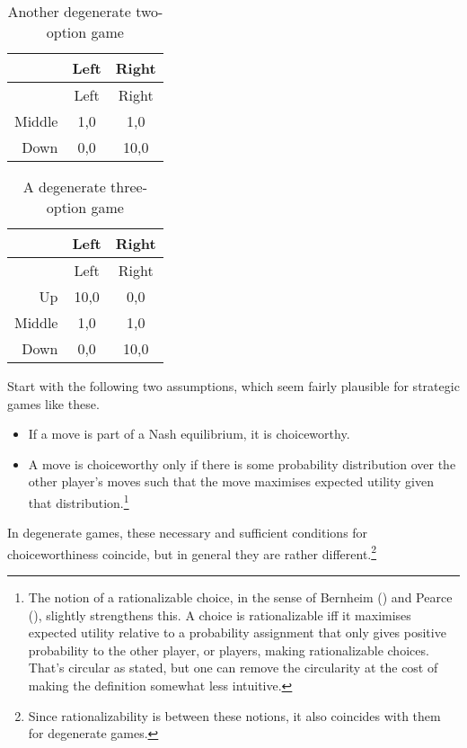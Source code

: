 \documentclass[
  11pt,
  letterpaper,
  DIV=11,
  numbers=noendperiod,
  twoside]{scrartcl}
\providecommand{\tightlist}{%
  \setlength{\itemsep}{0pt}\setlength{\parskip}{0pt}}
\begin{document}
\begin{longtable}[]{@{}rcc@{}}
\caption{Another degenerate two-option
game}\label{tbl-middown}\tabularnewline
\toprule\noalign{}
& Left & Right \\
\midrule\noalign{}
\endfirsthead
\toprule\noalign{}
& Left & Right \\
\midrule\noalign{}
\endhead
\bottomrule\noalign{}
\endlastfoot
Middle & 1,0 & 1,0 \\
Down & 0,0 & 10,0 \\
\end{longtable}

\begin{longtable}[]{@{}rcc@{}}
\caption{A degenerate three-option
game}\label{tbl-allthree}\tabularnewline
\toprule\noalign{}
& Left & Right \\
\midrule\noalign{}
\endfirsthead
\toprule\noalign{}
& Left & Right \\
\midrule\noalign{}
\endhead
\bottomrule\noalign{}
\endlastfoot
Up & 10,0 & 0,0 \\
Middle & 1,0 & 1,0 \\
Down & 0,0 & 10,0 \\
\end{longtable}

Start with the following two assumptions, which seem fairly plausible
for strategic games like these.

\begin{itemize}
\tightlist
\item
  If a move is part of a Nash equilibrium, it is choiceworthy.
\item
  A move is choiceworthy only if there is some probability distribution
  over the other player's moves such that the move maximises expected
  utility given that distribution.\footnote{The notion of a
    rationalizable choice, in the sense of Bernheim
    () and Pearce
    (), slightly strengthens this. A
    choice is rationalizable iff it maximises expected utility relative
    to a probability assignment that only gives positive probability to
    the other player, or players, making rationalizable choices. That's
    circular as stated, but one can remove the circularity at the cost
    of making the definition somewhat less intuitive.}
\end{itemize}

In degenerate games, these necessary and sufficient conditions for
choiceworthiness coincide, but in general they are rather
different.\footnote{Since rationalizability is between these notions, it
  also coincides with them for degenerate games.}
\end{document}
